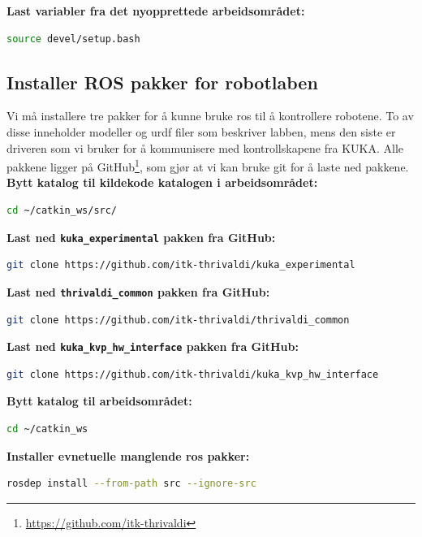 \documentclass{article}
\begin{document}
\noindent\textbf{Last variabler fra det nyopprettede arbeidsområdet:}
\begin{lstlisting}[language=bash]
source devel/setup.bash 
\end{lstlisting}

\subsection{Installer ROS pakker for robotlaben}
\label{install_support}
Vi må installere tre pakker for å kunne bruke \gls{ros} til å kontrollere robotene. To av disse inneholder modeller og \gls{urdf} filer som beskriver labben, mens den siste er driveren som vi bruker for å kommunisere med kontrollskapene fra KUKA. Alle pakkene ligger på GitHub\footnote{\url{https://github.com/itk-thrivaldi}}, som gjør at vi kan bruke git for å laste ned pakkene.\\


\noindent\textbf{Bytt katalog til kildekode katalogen i arbeidsområdet:}
\begin{lstlisting}[language=bash]
cd ~/catkin_ws/src/
\end{lstlisting}

\noindent\textbf{Last ned \texttt{kuka\_experimental} pakken fra GitHub:}
\begin{lstlisting}[language=bash]
git clone https://github.com/itk-thrivaldi/kuka_experimental
\end{lstlisting}

\noindent\textbf{Last ned \texttt{thrivaldi\_common} pakken fra GitHub:}
\begin{lstlisting}[language=bash]
git clone https://github.com/itk-thrivaldi/thrivaldi_common
\end{lstlisting}

\noindent\textbf{Last ned \texttt{kuka\_kvp\_hw\_interface} pakken fra GitHub:}
\begin{lstlisting}[language=bash]
git clone https://github.com/itk-thrivaldi/kuka_kvp_hw_interface
\end{lstlisting}

\noindent\textbf{Bytt katalog til arbeidsområdet:}
\begin{lstlisting}[language=bash]
cd ~/catkin_ws
\end{lstlisting}

\noindent\textbf{Installer evnetuelle manglende \gls{ros} pakker:}
\begin{lstlisting}[language=bash]
rosdep install --from-path src --ignore-src
\end{lstlisting}
\end{document}
